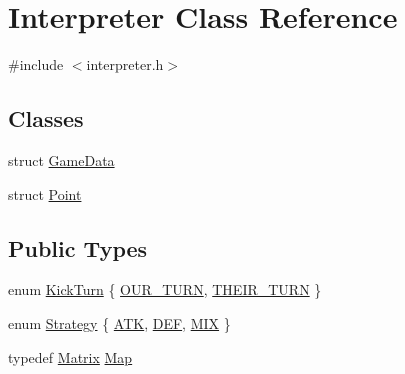\hypertarget{classInterpreter}{
\section{Interpreter Class Reference}
\label{classInterpreter}
}


{\ttfamily \#include $<$interpreter.h$>$}

\subsection*{Classes}
\begin{DoxyCompactItemize}
\item 
struct \hyperlink{structInterpreter_1_1GameData}{GameData}
\item 
struct \hyperlink{structInterpreter_1_1Point}{Point}
\end{DoxyCompactItemize}
\subsection*{Public Types}
\begin{DoxyCompactItemize}
\item 
enum \hyperlink{classInterpreter_ac7c3ba77d973ffbb84b12db662cfe643}{KickTurn} \{ \hyperlink{classInterpreter_ac7c3ba77d973ffbb84b12db662cfe643a8c18a3c8b220a0c8166c1ee4b3504ebe}{OUR\_\-TURN}, 
\hyperlink{classInterpreter_ac7c3ba77d973ffbb84b12db662cfe643ac196847925fbe4bc38ee72b9b97d0f76}{THEIR\_\-TURN}
 \}
\item 
enum \hyperlink{classInterpreter_a0fb49436c8c14ca79e13f1cd78119088}{Strategy} \{ \hyperlink{classInterpreter_a0fb49436c8c14ca79e13f1cd78119088a8bf993c8b673e31f609171552d65c4c4}{ATK}, 
\hyperlink{classInterpreter_a0fb49436c8c14ca79e13f1cd78119088ae58df17fd988314c295b980f6a5a6a75}{DEF}, 
\hyperlink{classInterpreter_a0fb49436c8c14ca79e13f1cd78119088a5509091a7f3746995da83c92dd449187}{MIX}
 \}
\item 
typedef \hyperlink{classMatrix}{Matrix} \hyperlink{classInterpreter_a4c080f069f557cf92dfe803117a6ea53}{Map}
\end{DoxyCompactItemize}
